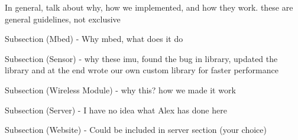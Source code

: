 In general, talk about why, how we implemented, and how they work. these are general guidelines, not exclusive

Subsection (Mbed)
- Why mbed, what does it do

Subsection (Sensor)
- why these imu, found the bug in library, updated the library and at the end wrote our own custom library for faster performance

Subsection (Wireless Module)
- why this? how we made it work

Subsection (Server)
- I have no idea what Alex has done here

Subsection (Website)
- Could be included in server section (your choice)